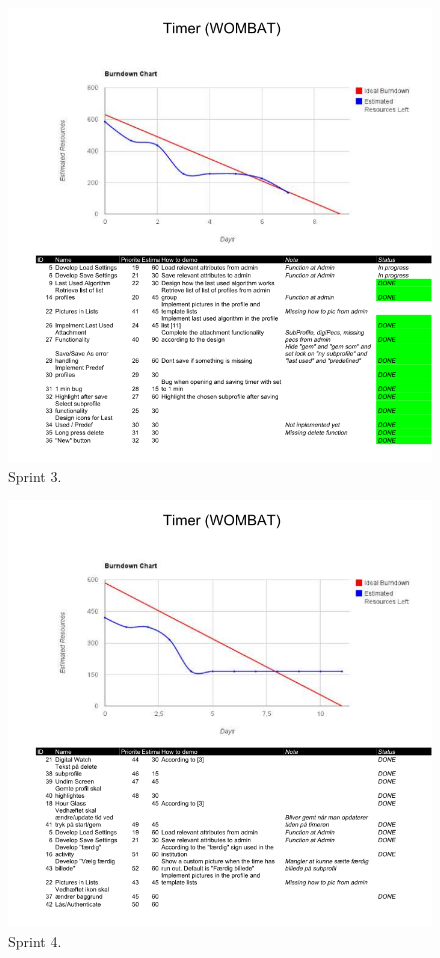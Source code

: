 	\begin{figure}[H]
		\centering
			\includegraphics[width=\textwidth]{Development/burndown_charts/Sprint_3.png}
				\caption{Sprint 3.}
		\label{fig:sprint3}
	\end{figure}
	
	\begin{figure}[H]
		\centering
			\includegraphics[width=\textwidth]{Development/burndown_charts/Sprint_4.png}
				\caption{Sprint 4.}
		\label{fig:sprint4}
	\end{figure}
	
